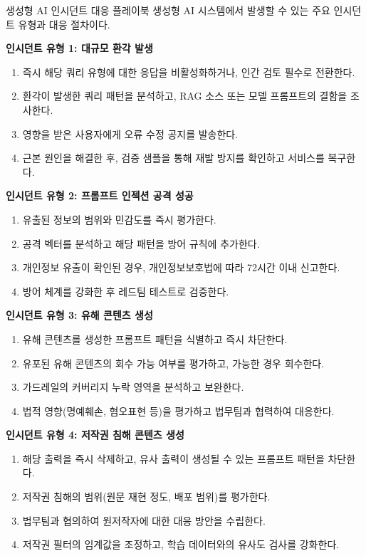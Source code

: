 \begin{practicaltool}{생성형 AI 인시던트 대응 플레이북}
생성형 AI 시스템에서 발생할 수 있는 주요 인시던트 유형과 대응 절차이다.

\textbf{인시던트 유형 1: 대규모 환각 발생}
\begin{enumerate}
 \item 즉시 해당 쿼리 유형에 대한 응답을 비활성화하거나, 인간 검토 필수로 전환한다.
 \item 환각이 발생한 쿼리 패턴을 분석하고, RAG 소스 또는 모델 프롬프트의 결함을 조사한다.
 \item 영향을 받은 사용자에게 오류 수정 공지를 발송한다.
 \item 근본 원인을 해결한 후, 검증 샘플을 통해 재발 방지를 확인하고 서비스를 복구한다.
\end{enumerate}

\textbf{인시던트 유형 2: 프롬프트 인젝션 공격 성공}
\begin{enumerate}
 \item 유출된 정보의 범위와 민감도를 즉시 평가한다.
 \item 공격 벡터를 분석하고 해당 패턴을 방어 규칙에 추가한다.
 \item 개인정보 유출이 확인된 경우, 개인정보보호법에 따라 72시간 이내 신고한다.
 \item 방어 체계를 강화한 후 레드팀 테스트로 검증한다.
\end{enumerate}

\textbf{인시던트 유형 3: 유해 콘텐츠 생성}
\begin{enumerate}
 \item 유해 콘텐츠를 생성한 프롬프트 패턴을 식별하고 즉시 차단한다.
 \item 유포된 유해 콘텐츠의 회수 가능 여부를 평가하고, 가능한 경우 회수한다.
 \item 가드레일의 커버리지 누락 영역을 분석하고 보완한다.
 \item 법적 영향(명예훼손, 혐오표현 등)을 평가하고 법무팀과 협력하여 대응한다.
\end{enumerate}

\textbf{인시던트 유형 4: 저작권 침해 콘텐츠 생성}
\begin{enumerate}
 \item 해당 출력을 즉시 삭제하고, 유사 출력이 생성될 수 있는 프롬프트 패턴을 차단한다.
 \item 저작권 침해의 범위(원문 재현 정도, 배포 범위)를 평가한다.
 \item 법무팀과 협의하여 원저작자에 대한 대응 방안을 수립한다.
 \item 저작권 필터의 임계값을 조정하고, 학습 데이터와의 유사도 검사를 강화한다.
\end{enumerate}


\end{practicaltool}
